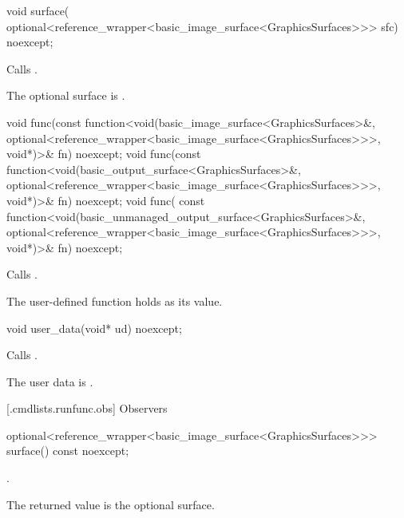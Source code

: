 %
\begin{itemdecl}
void surface(
  optional<reference_wrapper<basic_image_surface<GraphicsSurfaces>>> sfc) 
  noexcept;
\end{itemdecl}
\begin{itemdescr}
\pnum
\effects Calls .

\pnum
\remarks The optional surface is .
\end{itemdescr}

%
\begin{itemdecl}
void func(const function<void(basic_image_surface<GraphicsSurfaces>&, 
  optional<reference_wrapper<basic_image_surface<GraphicsSurfaces>>>, 
  void*)>& fn) noexcept;
void func(const function<void(basic_output_surface<GraphicsSurfaces>&, 
  optional<reference_wrapper<basic_image_surface<GraphicsSurfaces>>>, 
  void*)>& fn) noexcept;
void func(
  const function<void(basic_unmanaged_output_surface<GraphicsSurfaces>&, 
  optional<reference_wrapper<basic_image_surface<GraphicsSurfaces>>>, 
  void*)>& fn) noexcept;
\end{itemdecl}
\begin{itemdescr}
\pnum
\effects Calls .

\pnum
\remarks The user-defined function holds  as its value.
\end{itemdescr}

%
\begin{itemdecl}
void user_data(void* ud) noexcept;
\end{itemdecl}
\begin{itemdescr}
\pnum
\effects Calls .

\pnum
\remarks The user data is .
\end{itemdescr}

 [\iotwod.cmdlists.runfunc.obs] {Observers}%

%
\begin{itemdecl}
optional<reference_wrapper<basic_image_surface<GraphicsSurfaces>>> 
  surface() const noexcept;
\end{itemdecl}
\begin{itemdescr}
\pnum
\returns {}.

\pnum
\remarks
The returned value is the optional surface.
\end{itemdescr}

